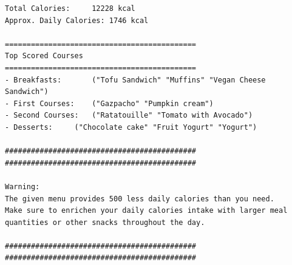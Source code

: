 \documentclass[12]{article}
\begin{document}
\begin{lstlisting}
Total Calories:		12228 kcal
Approx. Daily Calories:	1746 kcal

============================================
Top Scored Courses
============================================
- Breakfasts:		("Tofu Sandwich" "Muffins" "Vegan Cheese Sandwich")
- First Courses:	("Gazpacho" "Pumpkin cream")
- Second Courses:	("Ratatouille" "Tomato with Avocado")
- Desserts:		("Chocolate cake" "Fruit Yogurt" "Yogurt")

############################################
############################################

Warning:
The given menu provides 500 less daily calories than you need.
Make sure to enrichen your daily calories intake with larger meal quantities or other snacks throughout the day.

############################################
############################################
\end{lstlisting}
\end{document}
